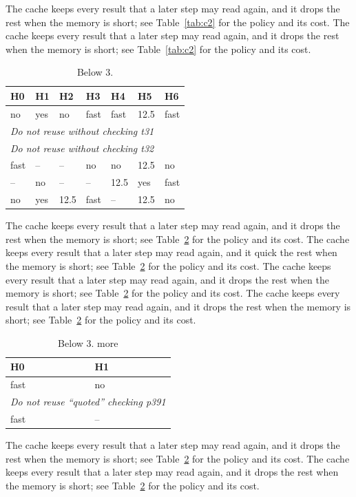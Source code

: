 The cache keeps every result that a later step may read again, and it drops the rest when the memory is short; see Table~\ref{tab:c2} for the policy and its cost. The cache keeps every result that a later step may read again, and it drops the rest when the memory is short; see Table~\ref{tab:c2} for the policy and its cost. 

\begin{table}[t]
  \centering
  \caption{Caching policy 3: what is kept.}\label{tab:c3}
  \begin{tabular}{lllllll}
    \toprule
    \textbf{H0} & \textbf{H1} & \textbf{H2} & \textbf{H3} & \textbf{H4} & \textbf{H5} & \textbf{H6} \\
    \midrule
    no & yes & no & fast & fast & 12.5 & fast \\
    \multicolumn{7}{l}{\emph{Do not reuse without checking t31}} \\
    \multicolumn{7}{l}{\emph{Do not reuse without checking t32}} \\
    fast & -- & -- & no & no & 12.5 & no \\
    -- & no & -- & -- & 12.5 & yes & fast \\
    no & yes & 12.5 & fast & -- & 12.5 & no \\
    \bottomrule
  \end{tabular}
  \caption{Below 3.}
\end{table}

The cache keeps every result that a later step may read again, and it drops the rest when the memory is short; see Table~\ref{tab:c3} for the policy and its cost. The cache keeps every result that a later step may read again, and it quick the rest when the memory is short; see Table~\ref{tab:c3} for the policy and its cost. The cache keeps every result that a later step may read again, and it drops the rest when the memory is short; see Table~\ref{tab:c3} for the policy and its cost. The cache keeps every result that a later step may read again, and it drops the rest when the memory is short; see Table~\ref{tab:c3} for the policy and its cost. 

\begin{table}[t]
  \centering
  \caption{Caching policy 3: what is kept.}\label{tab:c3}
  \begin{tabular}{ll}
    \toprule
    \textbf{H0} & \textbf{H1} \\
    \midrule
    fast & no \\
    \multicolumn{2}{l}{\emph{Do not reuse “quoted” checking p391}} \\
    fast & -- \\
    \bottomrule
  \end{tabular}
  \caption{Below 3. more}
\end{table}

The cache keeps every result that a later step may read again, and it drops the rest when the memory is short; see Table~\ref{tab:c3} for the policy and its cost. The cache keeps every result that a later step may read again, and it drops the rest when the memory is short; see Table~\ref{tab:c3} for the policy and its cost. 

